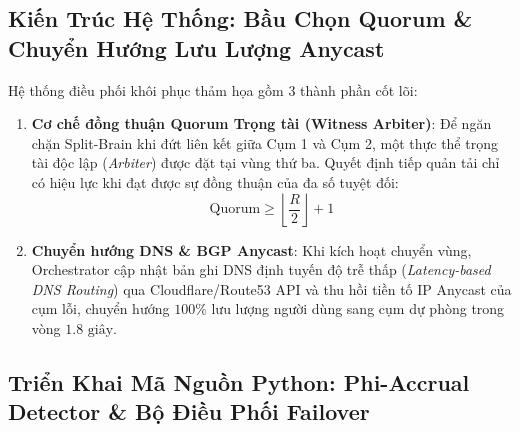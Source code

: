 \subsection{Kiến Trúc Hệ Thống: Bầu Chọn Quorum \& Chuyển Hướng Lưu Lượng Anycast}
Hệ thống điều phối khôi phục thảm họa gồm 3 thành phần cốt lõi:
\begin{enumerate}
  \item \textbf{Cơ chế đồng thuận Quorum Trọng tài (Witness Arbiter)}: Để ngăn chặn Split-Brain khi đứt liên kết giữa Cụm 1 và Cụm 2, một thực thể trọng tài độc lập (\textit{Arbiter}) được đặt tại vùng thứ ba. Quyết định tiếp quản tải chỉ có hiệu lực khi đạt được sự đồng thuận của đa số tuyệt đối:
  \begin{equation}
  \text{Quorum} \ge \left\lfloor \frac{R}{2} \right\rfloor + 1
  \end{equation}
  \item \textbf{Chuyển hướng DNS \& BGP Anycast}: Khi kích hoạt chuyển vùng, Orchestrator cập nhật bản ghi DNS định tuyến độ trễ thấp (\textit{Latency-based DNS Routing}) qua Cloudflare/Route53 API và thu hồi tiền tố IP Anycast của cụm lỗi, chuyển hướng $100\%$ lưu lượng người dùng sang cụm dự phòng trong vòng $1.8\text{ giây}$.
\end{enumerate}

\subsection{Triển Khai Mã Nguồn Python: Phi-Accrual Detector \& Bộ Điều Phối Failover}

